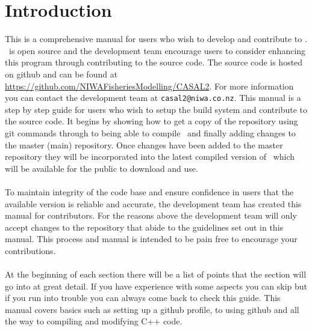 \section{Introduction\label{sec:Introduction}}
This is a comprehensive manual for users who wish to develop and contribute to \CNAME. \CNAME\ is open source and the development team encourage users to consider enhancing this program through contributing to the source code. The source code is hosted on github and can be found at \url{https://github.com/NIWAFisheriesModelling/CASAL2}. For more information you can contact the development team at \texttt{casal2@niwa.co.nz}. This manual is a step by step guide for users who wish to setup the build system and contribute to the source code. It begins by showing how to get a copy of the repository using git commands through to being able to compile \CNAME\ and finally adding changes to the master (main) repository. Once changes have been added to the master repository they will be incorporated into the latest compiled version of \CNAME\ which will be available for the public to download and use. 
\\\\
To maintain integrity of the code base and ensure confidence in users that the available version is reliable and accurate, the development team has created this manual for contributors. For the reasons above the development team will only accept changes to the repository that abide to the guidelines set out in this manual. This process and manual is intended to be pain free to encourage your contributions.
\\\\
At the beginning of each section there will be a list of points that the section will go into at great detail. If you have experience with some aspects you can skip but if you run into trouble you can always come back to check this guide. This manual covers basics such as setting up a github profile, to using github and all the way to compiling and modifying C++ code.

